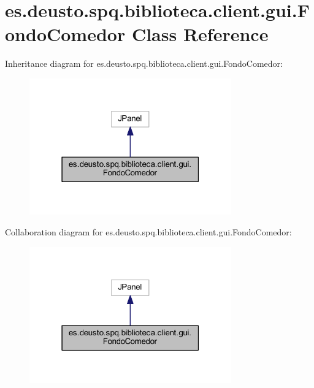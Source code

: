 \hypertarget{classes_1_1deusto_1_1spq_1_1biblioteca_1_1client_1_1gui_1_1_fondo_comedor}{}\section{es.\+deusto.\+spq.\+biblioteca.\+client.\+gui.\+Fondo\+Comedor Class Reference}
\label{classes_1_1deusto_1_1spq_1_1biblioteca_1_1client_1_1gui_1_1_fondo_comedor}


Inheritance diagram for es.\+deusto.\+spq.\+biblioteca.\+client.\+gui.\+Fondo\+Comedor\+:
\nopagebreak
\begin{figure}[H]
\begin{center}
\leavevmode
\includegraphics[width=247pt]{classes_1_1deusto_1_1spq_1_1biblioteca_1_1client_1_1gui_1_1_fondo_comedor__inherit__graph}
\end{center}
\end{figure}


Collaboration diagram for es.\+deusto.\+spq.\+biblioteca.\+client.\+gui.\+Fondo\+Comedor\+:
\nopagebreak
\begin{figure}[H]
\begin{center}
\leavevmode
\includegraphics[width=247pt]{classes_1_1deusto_1_1spq_1_1biblioteca_1_1client_1_1gui_1_1_fondo_comedor__coll__graph}
\end{center}
\end{figure}
